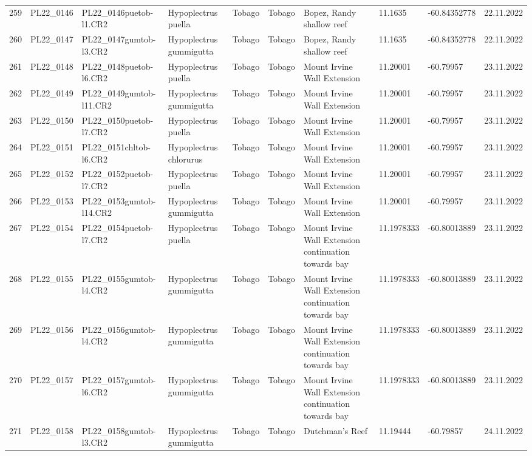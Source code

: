\begin{table}[ht]
\begin{tabular}{rlllllllll}
  259 & PL22\_0146 & PL22\_0146puetob-l1.CR2 & Hypoplectrus puella & Tobago & Tobago & Bopez, Randy shallow reef & 11.1635 & -60.84352778 & 22.11.2022 \\ 
  260 & PL22\_0147 & PL22\_0147gumtob-l3.CR2 & Hypoplectrus gummigutta & Tobago & Tobago & Bopez, Randy shallow reef & 11.1635 & -60.84352778 & 22.11.2022 \\ 
  261 & PL22\_0148 & PL22\_0148puetob-l6.CR2 & Hypoplectrus puella & Tobago & Tobago & Mount Irvine Wall Extension & 11.20001 & -60.79957 & 23.11.2022 \\ 
  262 & PL22\_0149 & PL22\_0149gumtob-l11.CR2 & Hypoplectrus gummigutta & Tobago & Tobago & Mount Irvine Wall Extension & 11.20001 & -60.79957 & 23.11.2022 \\ 
  263 & PL22\_0150 & PL22\_0150puetob-l7.CR2 & Hypoplectrus puella & Tobago & Tobago & Mount Irvine Wall Extension & 11.20001 & -60.79957 & 23.11.2022 \\ 
  264 & PL22\_0151 & PL22\_0151chltob-l6.CR2 & Hypoplectrus chlorurus & Tobago & Tobago & Mount Irvine Wall Extension & 11.20001 & -60.79957 & 23.11.2022 \\ 
  265 & PL22\_0152 & PL22\_0152puetob-l7.CR2 & Hypoplectrus puella & Tobago & Tobago & Mount Irvine Wall Extension & 11.20001 & -60.79957 & 23.11.2022 \\ 
  266 & PL22\_0153 & PL22\_0153gumtob-l14.CR2 & Hypoplectrus gummigutta & Tobago & Tobago & Mount Irvine Wall Extension & 11.20001 & -60.79957 & 23.11.2022 \\ 
  267 & PL22\_0154 & PL22\_0154puetob-l7.CR2 & Hypoplectrus puella & Tobago & Tobago & Mount Irvine Wall Extension continuation towards bay & 11.1978333 & -60.80013889 & 23.11.2022 \\ 
  268 & PL22\_0155 & PL22\_0155gumtob-l4.CR2 & Hypoplectrus gummigutta & Tobago & Tobago & Mount Irvine Wall Extension continuation towards bay & 11.1978333 & -60.80013889 & 23.11.2022 \\ 
  269 & PL22\_0156 & PL22\_0156gumtob-l4.CR2 & Hypoplectrus gummigutta & Tobago & Tobago & Mount Irvine Wall Extension continuation towards bay & 11.1978333 & -60.80013889 & 23.11.2022 \\ 
  270 & PL22\_0157 & PL22\_0157gumtob-l6.CR2 & Hypoplectrus gummigutta & Tobago & Tobago & Mount Irvine Wall Extension continuation towards bay & 11.1978333 & -60.80013889 & 23.11.2022 \\ 
  271 & PL22\_0158 & PL22\_0158gumtob-l3.CR2 & Hypoplectrus gummigutta & Tobago & Tobago & Dutchman's Reef & 11.19444 & -60.79857 & 24.11.2022 \\ 

\end{tabular}
\end{table}

